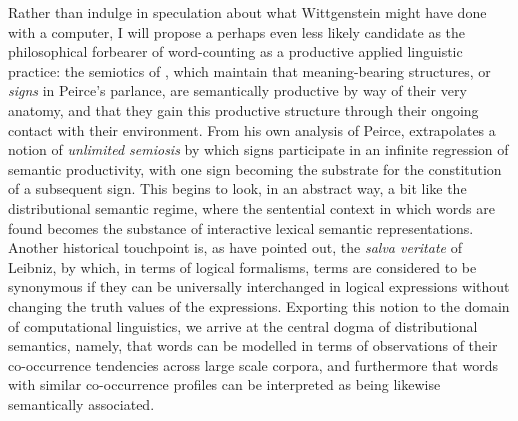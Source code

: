 Rather than indulge in speculation about what Wittgenstein might have done with a computer, I will propose a perhaps even less likely candidate as the philosophical forbearer of word-counting as a productive applied linguistic practice: the semiotics of \cite{Peirce1932}, which maintain that meaning-bearing structures, or \emph{signs} in Peirce's parlance, are semantically productive by way of their very anatomy, and that they gain this productive structure through their ongoing contact with their environment.  From his own analysis of Peirce, \cite{Eco1976} extrapolates a notion of \emph{unlimited semiosis} by which signs participate in an infinite regression of semantic productivity, with one sign becoming the substrate for the constitution of a subsequent sign.  This begins to look, in an abstract way, a bit like the distributional semantic regime, where the sentential context in which words are found becomes the substance of interactive lexical semantic representations.  Another historical touchpoint is, as \cite{MillerEA1991} have pointed out, the \emph{salva veritate} of Leibniz, by which, in terms of logical formalisms, terms are considered to be synonymous if they can be universally interchanged in logical expressions without changing the truth values of the expressions.  Exporting this notion to the domain of computational linguistics, we arrive at the central dogma of distributional semantics, namely, that words can be modelled in terms of observations of their co-occurrence tendencies across large scale corpora, and furthermore that words with similar co-occurrence profiles can be interpreted as being likewise semantically associated.

